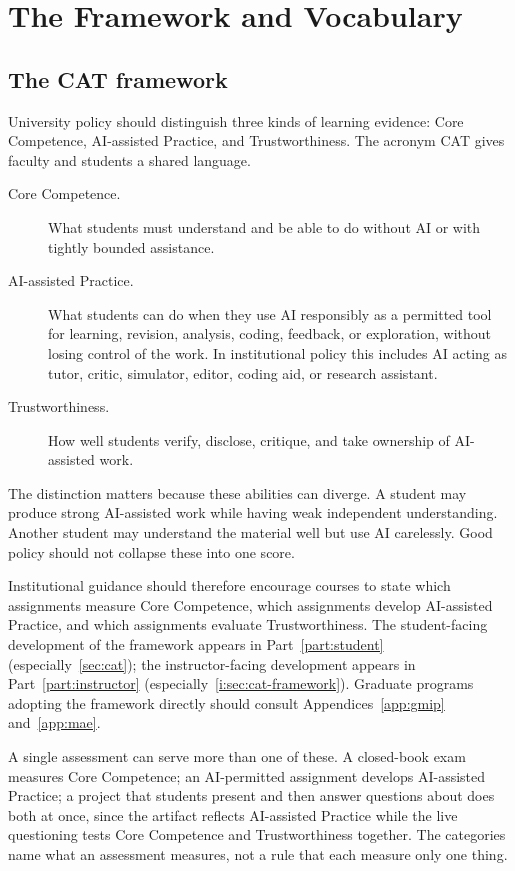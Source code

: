 \documentclass{SIAMbook2023}
\begin{document}
\chapter{The Framework and Vocabulary}
\label{u:ch:the-framework-and-vocabulary}%

\section{The CAT framework}
\label{u:sec:cat}%

University policy should distinguish three kinds of learning evidence: Core Competence, AI-assisted Practice, and Trustworthiness. The acronym CAT gives faculty and students a shared language.

\begin{description}
  \item[Core Competence.] What students must understand and be able to do without AI or with tightly bounded assistance.
  \item[AI-assisted Practice.] What students can do when they use AI responsibly as a permitted tool for learning, revision, analysis, coding, feedback, or exploration, without losing control of the work. In institutional policy this includes AI acting as tutor, critic, simulator, editor, coding aid, or research assistant.
  \item[Trustworthiness.] How well students verify, disclose, critique, and take ownership of AI-assisted work.
\end{description}

The distinction matters because these abilities can diverge. A student may produce strong AI-assisted work while having weak independent understanding. Another student may understand the material well but use AI carelessly. Good policy should not collapse these into one score.

Institutional guidance should therefore encourage courses to state which assignments measure Core Competence, which assignments develop AI-assisted Practice, and which assignments evaluate Trustworthiness. The student-facing development of the framework appears in Part~\ref{part:student} (especially~\cref{sec:cat}); the instructor-facing development appears in Part~\ref{part:instructor} (especially~\cref{i:sec:cat-framework}). Graduate programs adopting the framework directly should consult Appendices~\ref{app:gmip} and~\ref{app:mae}.

A single assessment can serve more than one of these. A closed-book exam measures Core Competence; an AI-permitted assignment develops AI-assisted Practice; a project that students present and then answer questions about does both at once, since the artifact reflects AI-assisted Practice while the live questioning tests Core Competence and Trustworthiness together. The categories name what an assessment measures, not a rule that each measure only one thing.
\end{document}
